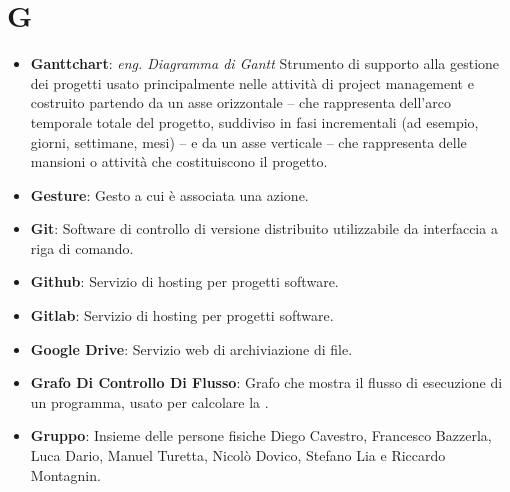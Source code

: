 \section*{G}
\begin{itemize}
	\item
	\textbf{Ganttchart}: \textit{eng. Diagramma di Gantt} Strumento di supporto alla gestione dei progetti usato principalmente nelle attività di project management e costruito partendo da un asse orizzontale -- che rappresenta dell'arco temporale totale del progetto, suddiviso in fasi incrementali (ad esempio, giorni, settimane, mesi) -- e da un asse verticale -- che rappresenta delle mansioni o attività che costituiscono il progetto.
	\item
	\textbf{Gesture}: Gesto a cui è associata una azione.
	\item
	\textbf{Git}: Software di controllo di versione distribuito utilizzabile da interfaccia a riga di comando.
	\item
	\textbf{Github}: Servizio di hosting per progetti software.
	\item
	\textbf{Gitlab}: Servizio di hosting per progetti software.
	\item
	\textbf{Google Drive}: Servizio web di archiviazione di file.
	\item
	\textbf{Grafo Di Controllo Di Flusso}: Grafo che mostra il flusso di esecuzione di un programma, usato per calcolare la .
	\item
	\textbf{Gruppo}: Insieme delle persone fisiche Diego Cavestro, Francesco Bazzerla, Luca Dario, Manuel Turetta, Nicolò Dovico, Stefano Lia e Riccardo Montagnin.
\end{itemize}
\newpage